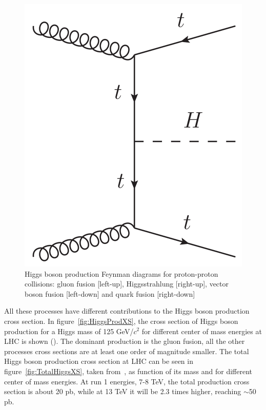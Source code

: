 \begin{figure}[!Hhtbp]
\begin{center}
    \includegraphics[scale=0.45]{figs/QuarkF_H.png}
    \caption{Higgs boson production Feynman diagrams for proton-proton collisions: gluon fusion [left-up], Higgsstrahlung [right-up], vector boson fusion [left-down] and quark fusion [right-down]}
    \label{fig:HiggsProd}
  \end{center}
\end{figure}

All these processes have different contributions to the Higgs boson production cross section. In figure~\ref{fig:HiggsProdXS}, the cross section of Higgs boson production for a Higgs mass of 125 GeV/$c^{2}$ for different center of mass energies at LHC is shown (\cite{Dittmaier:2011ti, Dittmaier:2012vm, Heinemeyer:2013tqa, HIGGSXSWG}). The dominant production is the gluon fusion, all the other processes cross sections are at least one order of magnitude smaller. The total Higgs boson production cross section at LHC can be seen in figure~\ref{fig:TotalHiggsXS}, taken from~\cite{Dittmaier:2011ti, Dittmaier:2012vm, Heinemeyer:2013tqa, HIGGSXSWG}, as function of its mass and for different center of mass energies. At run 1 energies, 7-8 TeV, the total production cross section is about 20 pb, while at 13 TeV it will be 2.3 times higher, reaching $\sim$50 pb. 

